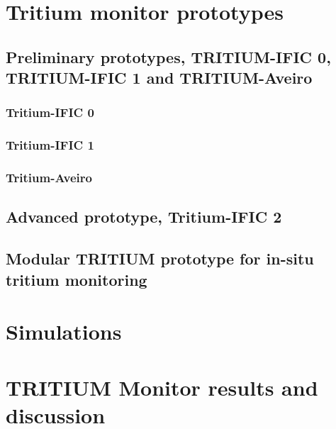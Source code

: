 \documentclass[12pt,a4paper]{book}
\begin{document}
\chapter{Tritium monitor prototypes}\label{chap:Prototypes}	
	
	\section[Preliminary prototypes]{Preliminary prototypes, TRITIUM-IFIC 0, TRITIUM-IFIC 1 and TRITIUM-Aveiro}\label{sec:Preliminary_prototypes}
		\subsection{Tritium-IFIC 0}
		
		\subsection{Tritium-IFIC 1}
		
		\subsection{Tritium-Aveiro}
		\newpage
		
	\section[Tritium-IFIC 2]{Advanced prototype, Tritium-IFIC 2}
	\newpage
		
	\section[Modular TRITIUM prototype]{Modular TRITIUM prototype for in-situ tritium monitoring}
	\newpage

\chapter{Simulations}  \label{chap:Simulations}
\newpage
	
\chapter[Results and discussion]{TRITIUM Monitor results and discussion}\label{chap:Results}
\end{document}
